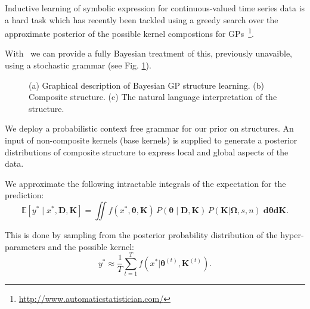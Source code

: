 Inductive learning of symbolic expression for continuous-valued time series
data is a hard task which has recently been tackled using a greedy search over 
the approximate posterior of the possible kernel compostions for
\ac{GP}s~\citep{duvenaud2013structure,lloyd2014automatic}\footnote{\url{http://www.automaticstatistician.com/}}.

With \gpmem\ we can provide a fully Bayesian treatment of this, previously unavaible,
using a stochastic grammar  (see Fig. \ref{fig:schema}).

\begin{figure}
\centering

\caption{(a) Graphical description of Bayesian GP structure learning. (b) Composite structure. (c) The natural language interpretation of the structure.}\label{fig:schema}
\end{figure}

We deploy a probabilistic context free grammar for our prior on structures. An input of non-composite kernels (base kernels) is supplied to generate a posterior distributions of composite structure to express local and global aspects of the data.


We approximate the following intractable integrals of the expectation for the prediction:
\begin{equation}
\mathbb{E}[y^* \mid x^*,\mathbf{D},\mathbf{K}] =\iint f(x^*,\bm{\theta},\mathbf{K})\,P(\bm{\theta} \mid \mathbf{D,\mathbf{K}})\,P(\mathbf{K}|\bm{\Omega},s,n) \; \mathbf{d} \bm{\theta} \mathbf{d} \mathbf{K}.  
\end{equation}

This is done by sampling from the posterior probability distribution of the hyper-parameters and the possible kernel:
\begin{equation}
y^* \approx \frac{1}{T} \sum^T_{t=1} f(x^* | \bm{\theta}^{(t)},\mathbf{K}^{(t)}). 
\end{equation}


